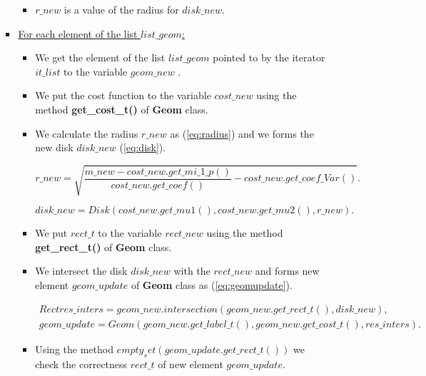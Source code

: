 \documentclass{report}
\begin{document}
\begin{itemize}
\begin{itemize}
\begin{itemize}
\begin{itemize}
				\item $r\_new$ is a value of the radius for $disk\_new$.	
			\end{itemize}
	
			\item \underline {For each element of the list $list\_geom$:} 
			
			\begin{itemize}
				\item We get the element of the list $list\_geom$ pointed to by the iterator $it\_list$ to the variable $geom\_new$ .
				
				\item We put the cost function to the variable $cost\_new$ using the method {\bfseries get\_cost\_t()} of {\bfseries Geom} class.
				
				\item We calculate the radius $r\_new$ as (\ref{eq:radius}) and we forms the new disk $disk\_new$ (\ref{eq:disk}).
				
				\begin{equation}
					r\_new = \sqrt{\frac{m\_new - cost\_new.get\_mi\_1\_p()}{cost\_new.get\_coef()} - cost\_new.get\_coef\_Var()}.
					\label{eq:radius}
				\end{equation}
				
				\begin{equation}
					disk\_new = Disk(cost\_new.get\_mu1(), cost\_new.get\_mu2(), r\_new).
					\label{eq:disk}
				\end{equation}
				
				\item We put $rect\_t$ to the variable $rect\_new$ using the method {\bfseries get\_rect\_t()} of {\bfseries Geom} class.
				
				\item We intersect the disk $disk\_new$  with the $rect\_new$ and forms new element $geom\_update$ of {\bfseries Geom} class as (\ref{eq:geomupdate}).
			
				\begin{equation}
					\begin{gathered}
					Rect res\_inters = geom\_new.intersection(geom\_new.get\_rect\_t(), disk\_new),\\
					geom\_update = Geom(geom\_new.get\_label\_t(), geom\_new.get\_cost\_t(), res\_inters).
					\label{eq:geomupdate}
					\end{gathered}
				\end{equation}
				
				\item Using the method $empty_set(geom\_update.get\_rect\_t())$ we check the correctness  $rect\_t$ of new element $geom\_update$. 
				

\end{itemize}
\end{itemize}
\end{itemize}
\end{itemize}
\end{document}
